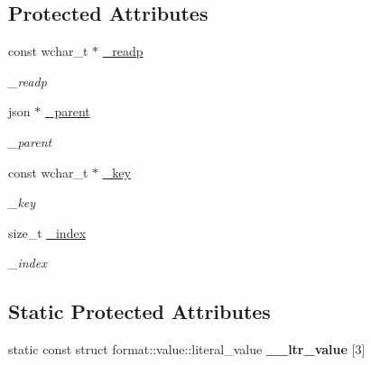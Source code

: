 \subsection*{Protected Attributes}
\begin{DoxyCompactItemize}
\item 
const wchar\+\_\+t $\ast$ \hyperlink{classformat_1_1value_a1bbc05a0a601228e7282dc748cbe3d01}{\+\_\+readp}\hypertarget{classformat_1_1value_a1bbc05a0a601228e7282dc748cbe3d01}{}\label{classformat_1_1value_a1bbc05a0a601228e7282dc748cbe3d01}

\begin{DoxyCompactList}\small\item\em \+\_\+readp \end{DoxyCompactList}\item 
json $\ast$ \hyperlink{classformat_1_1value_a933c180828081a6b7582fca1b268b389}{\+\_\+parent}\hypertarget{classformat_1_1value_a933c180828081a6b7582fca1b268b389}{}\label{classformat_1_1value_a933c180828081a6b7582fca1b268b389}

\begin{DoxyCompactList}\small\item\em \+\_\+parent \end{DoxyCompactList}\item 
const wchar\+\_\+t $\ast$ \hyperlink{classformat_1_1value_af4f315a1f5b893f57b533117102938dd}{\+\_\+key}\hypertarget{classformat_1_1value_af4f315a1f5b893f57b533117102938dd}{}\label{classformat_1_1value_af4f315a1f5b893f57b533117102938dd}

\begin{DoxyCompactList}\small\item\em \+\_\+key \end{DoxyCompactList}\item 
size\+\_\+t \hyperlink{classformat_1_1value_af86a1855af003b54881a284a99463f37}{\+\_\+index}\hypertarget{classformat_1_1value_af86a1855af003b54881a284a99463f37}{}\label{classformat_1_1value_af86a1855af003b54881a284a99463f37}

\begin{DoxyCompactList}\small\item\em \+\_\+index \end{DoxyCompactList}\end{DoxyCompactItemize}
\subsection*{Static Protected Attributes}
\begin{DoxyCompactItemize}
\item 
static const struct format\+::value\+::literal\+\_\+value {\bfseries \+\_\+\+\_\+ltr\+\_\+value} \mbox{[}3\mbox{]}\hypertarget{classformat_1_1value_afb89a1ddf5bf430f6fe26adc263abe2d}{}\label{classformat_1_1value_afb89a1ddf5bf430f6fe26adc263abe2d}

\end{DoxyCompactItemize}

